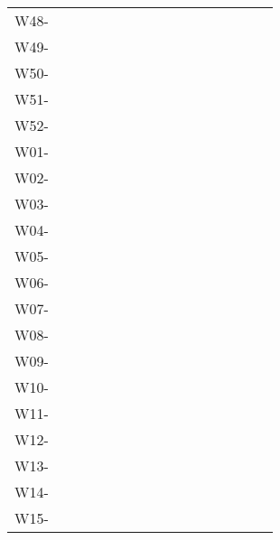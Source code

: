 \documentclass{article}
\begin{document}
\begin{table}
  \centering
  \begin{tabular}{l c c c c c c c r c c c c c c c}
    W48-\hspace{2cm}  \\
    W49-\hspace{2cm}  \\
    W50-\hspace{2cm}  \\
    W51-\hspace{2cm}  \\
    W52-\hspace{2cm}  \\
    W01-\hspace{2cm}  \\
    W02-\hspace{2cm}  \\
    W03-\hspace{2cm}  \\
    W04-\hspace{2cm}  \\
    W05-\hspace{2cm}  \\
    W06-\hspace{2cm}  \\
    W07-\hspace{2cm}  \\
    W08-\hspace{2cm}  \\
    W09-\hspace{2cm}  \\
    W10-\hspace{2cm}  \\
    W11-\hspace{2cm}  \\
    W12-\hspace{2cm}  \\
    W13-\hspace{2cm}  \\
    W14-\hspace{2cm}  \\
    W15-\hspace{2cm}  \\
  \end{tabular}
\end{table}
\end{document}
